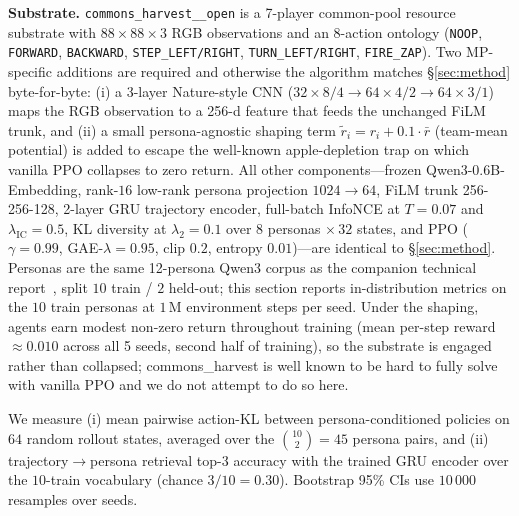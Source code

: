 \documentclass[conference]{IEEEtran}
\begin{document}
\noindent\textbf{Substrate.}
\texttt{commons\_harvest\_\_open} is a 7-player common-pool resource substrate with
$88\!\times\!88\!\times\!3$ RGB observations and an 8-action ontology
(\texttt{NOOP}, \texttt{FORWARD}, \texttt{BACKWARD}, \texttt{STEP\_LEFT/RIGHT},
\texttt{TURN\_LEFT/RIGHT}, \texttt{FIRE\_ZAP}). Two MP-specific additions are
required and otherwise the algorithm matches \S\ref{sec:method} byte-for-byte:
(i) a 3-layer Nature-style CNN
($32\!\times\!8/4 \to 64\!\times\!4/2 \to 64\!\times\!3/1$) maps the RGB
observation to a 256-d feature that feeds the unchanged FiLM trunk, and (ii) a
small persona-agnostic shaping term $\tilde r_i = r_i + 0.1\cdot\bar r$
(team-mean potential) is added to escape the well-known apple-depletion trap on
which vanilla PPO collapses to zero return. All other components---frozen
Qwen3-0.6B-Embedding, rank-$16$ low-rank persona projection $1024\!\to\!64$, FiLM
trunk 256-256-128, 2-layer GRU trajectory encoder, full-batch InfoNCE at
$T\!=\!0.07$ and $\lambda_{\text{IC}}\!=\!0.5$, KL diversity at
$\lambda_2\!=\!0.1$ over $8$ personas $\times\,32$ states, and PPO
($\gamma\!=\!0.99$, GAE-$\lambda\!=\!0.95$, clip $0.2$, entropy $0.01$)---are
identical to \S\ref{sec:method}. Personas are the same 12-persona Qwen3
corpus as the companion technical report~\cite{phase5report}, split
$10$ train / $2$ held-out; this section reports in-distribution metrics on the
$10$ train personas at $1\,\text{M}$ environment steps per seed. Under the
shaping, agents earn modest non-zero return throughout training (mean per-step
reward $\approx\!0.010$ across all 5 seeds, second half of training), so the
substrate is engaged rather than collapsed; commons\_harvest is well known to be
hard to fully solve with vanilla PPO and we do not attempt to do so here.

We measure (i) mean pairwise action-KL between persona-conditioned policies on
$64$ random rollout states, averaged over the $\binom{10}{2}\!=\!45$ persona pairs,
and (ii) trajectory$\to$persona retrieval top-3 accuracy with the trained GRU
encoder over the $10$-train vocabulary (chance $3/10\!=\!0.30$). Bootstrap 95\%
CIs use $10\,000$ resamples over seeds.
\end{document}
